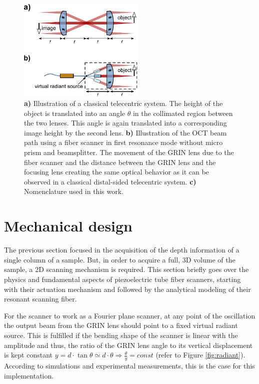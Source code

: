 \documentclass[10pt]{iopart}
\begin{document}
\begin{figure}[h!]\centering \includegraphics[width=6cm]{figures/fps2.pdf}
      \caption{\textbf{a)} Illustration of a classical telecentric system. The height of the object is translated into an angle $\theta$ in the collimated region between the two lenses. This angle is again translated into a corresponding image height by the second lens.
      \textbf{b)} Illustration of the OCT beam path using a fiber scanner in first resonance mode without micro prism and beamsplitter. The movement of the GRIN lens due to the fiber scanner and the distance between the GRIN lens and the focusing lens creating the same optical behavior as it can be observed in a classical distal-sided telecentric system. \textbf{c)} Nomenclature used in this work.}
      \label{fig:fps}		
\end{figure}



\section{Mechanical design}

The previous section focused in the acquisition of the depth information of a single column of a sample. But, in order to acquire a full, 3D volume of the sample, a 2D scanning mechanism is required. This section briefly goes over the physics and fundamental aspects of piezoelectric tube fiber scanners, starting with their actuation mechanism and followed by the analytical modeling of their resonant scanning fiber.

For the scanner to work as a Fourier plane scanner, at any point of the oscillation the output beam from the GRIN lens should point to a fixed virtual radiant source. This is fulfilled if the bending shape of the scanner is linear with the amplitude and thus, the ratio of the GRIN lens angle to its vertical displacement is kept constant $ y = d \cdot \tan \theta \simeq d \cdot \theta \Rightarrow \frac{\theta}{y} = const $ (refer to Figure \ref{fig:radiant}). According to simulations and experimental measurements, this is the case for this implementation.
\end{document}
